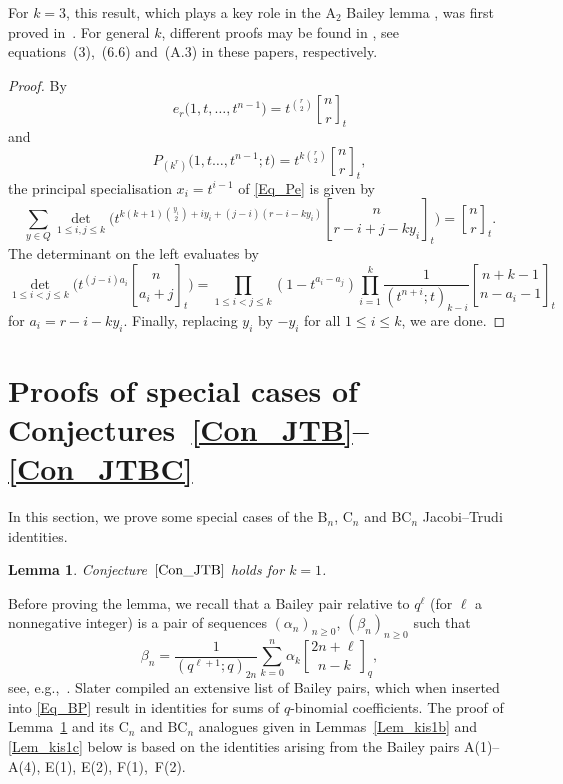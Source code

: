\documentclass[pdftex]{sigma}
\numberwithin{equation}{section}
\newtheorem{Lemma}[Theorem]{Lemma}
\renewcommand{\leq}{\leqslant}
\renewcommand{\geq}{\geqslant}
\newcommand{\qbin}[2]{\genfrac{[}{]}{0pt}{}{#1}{#2}}
\begin{document}
For $k=3$, this result, which plays a key role in the $\mathrm{A}_2$
Bailey lemma \cite{ASW99,W25}, was first proved in~\cite[p.~692]{ASW99}.
For general $k$, different proofs may be found in \cite{Krattenthaler01, W99,W25}, see equations~(3),~(6.6) and~(A.3) in these papers,
respectively.

\begin{proof}
By \cite[p.~27]{Macdonald95}
\[
e_r\bigl(1,t,\dots,t^{n-1}\bigr)=t^{\binom{r}{2}}\qbin{n}{r}_t
\]
and \cite[p.~213]{Macdonald95}
\begin{equation}\label{Eq_213}
P_{(k^r)}\bigl(1,t\dots,t^{n-1};t\bigr)=t^{k\binom{r}{2}} \qbin{n}{r}_t,
\end{equation}
the principal specialisation $x_i=t^{i-1}$ of \eqref{Eq_Pe} is given by
\[
\sum_{y\in Q} \det_{1\leq i,j\leq k}
\biggl(t^{k(k+1)\binom{y_i}{2}+iy_i+(j-i)(r-i-ky_i)}
\qbin{n}{r-i+j-ky_i}_t \biggr)=\qbin{n}{r}_t.
\]
The determinant on the left evaluates by \cite[p.~169]{Krattenthaler90}
\[
\det_{1\leq i<j\leq k} \biggl(t^{(j-i)a_i}\qbin{n}{a_i+j}_t\biggr)
=\prod_{1\leq i<j\leq k} (1-t^{a_i-a_j})
\prod_{i=1}^k \frac{1}{(t^{n+i};t)_{k-i}}
\qbin{n+k-1}{n-a_i-1}_t
\]
for $a_i=r-i-ky_i$.
Finally, replacing $y_i$ by $-y_i$ for all $1\leq i\leq k$, we are done.
\end{proof}

\section{Proofs of special cases of Conjectures~\ref{Con_JTB}--\ref{Con_JTBC}}
\label{Sec_JTBC}

In this section, we prove some special cases of the $\mathrm{B}_n$,
$\mathrm{C}_n$ and $\mathrm{BC}_n$ Jacobi--Trudi identities.

\begin{Lemma}\label{Lem_kis1}
Conjecture~$\ref{Con_JTB}$ holds for $k=1$.
\end{Lemma}

Before proving the lemma, we recall that a Bailey pair relative to
$q^{\ell}$ (for $\ell$ a nonnegative integer) is a pair of sequences
$(\alpha_n)_{n\geq 0}$, $(\beta_n)_{n\geq 0}$ such that
\begin{equation}\label{Eq_BP}
\beta_n=\frac{1}{(q^{\ell+1};q)_{2n}}\sum_{k=0}^n
\alpha_k \qbin{2n+\ell}{n-k}_q,
\end{equation}
see, e.g.,~\cite{Andrews84,Bailey48,McLaughlin18,W01a}.
Slater \cite{Slater51} compiled an extensive list of Bailey pairs,
which when inserted into \eqref{Eq_BP} result in identities
for sums of $q$-binomial coefficients.
The proof of Lemma~\ref{Lem_kis1} and its $\mathrm{C}_n$
and $\mathrm{BC}_n$ analogues given in Lemmas~\ref{Lem_kis1b} and
\ref{Lem_kis1c} below is based on the identities arising from the
Bailey pairs A(1)--A(4), E(1), E(2), F(1),~F(2).
\end{document}
